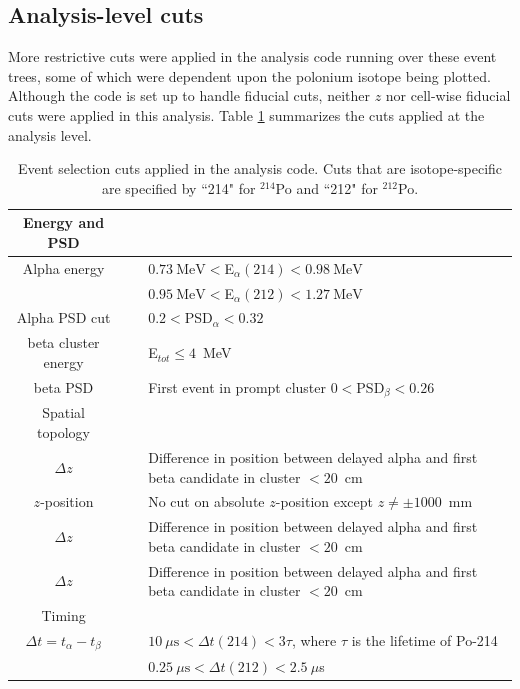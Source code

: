 \subsection{Analysis-level cuts}
More restrictive cuts were applied in the analysis code running over these event trees, some of which were dependent upon the polonium isotope being plotted.
Although the code is set up to handle fiducial cuts, neither $z$ nor cell-wise fiducial cuts were applied in this analysis. Table \ref{tab:analysiscuts} summarizes the cuts applied at the analysis level.
\begin{table}
\begin{center}
\caption{\label{tab:analysiscuts}Event selection cuts applied in the analysis code. Cuts that are isotope-specific are specified by ``214" for $^{214}$Po and ``212" for $^{212}$Po.}
\begin{tabular}[ht]{c c p{10.5cm}}\hline
Energy and PSD&~&~\\\hline\hline
Alpha energy &\vline& $0.73~\textrm{MeV}<$E$_{\alpha}(214)<0.98~\textrm{MeV}$\\
~&\vline&$0.95~\textrm{MeV}<$E$_{\alpha}(212)<1.27~\textrm{MeV}$  \\
Alpha PSD cut& \vline&$0.2<$PSD$_{\alpha}<0.32$\\
beta cluster energy &\vline& E$_{tot}\leq 4$~MeV\\
beta PSD & \vline&First event in prompt cluster $0<$PSD$_{\beta}<0.26$\\\hline
Spatial topology&~&~\\\hline\hline
$\Delta z$&\vline&Difference in position between delayed alpha and first beta candidate in cluster $<20$~cm\\\hline
$z$-position&\vline& No cut on absolute $z$-position except $z\neq \pm1000$~mm\\
$\Delta z$&\vline&Difference in position between delayed alpha and first beta candidate in cluster $<20$~cm\\\hline
$\Delta z$&\vline&Difference in position between delayed alpha and first beta candidate in cluster $<20$~cm\\\hline
Timing&~&~\\\hline\hline
$\Delta t=t_{\alpha}-t_{\beta}$&\vline &$10~\mu\textrm{s}< \Delta t(214) < 3\tau$, where $\tau$ is the lifetime of Po-214 \\
~&\vline&$0.25~\mu\textrm{s}< \Delta t(212) < 2.5~\mu$s\\\hline

\end{tabular}
\end{center}
\end{table}

